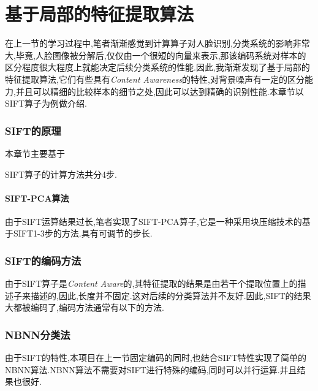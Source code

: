 \chapter{基于局部的特征提取算法}
在上一节的学习过程中,笔者渐渐感觉到计算算子对人脸识别,分类系统的影响非常大,毕竟,人脸图像被分解后,仅仅由一个很短的向量来表示,那该编码系统对样本的区分程度很大程度上就能决定后续分类系统的性能.因此,我渐渐发现了基于局部的特征提取算法,它们有些具有\textit{Content Awareness}的特性,对背景噪声有一定的区分能力,并且可以精细的比较样本的细节之处,因此可以达到精确的识别性能.本章节以SIFT算子为例做介绍.
\subsection{SIFT的原理}
本章节主要基于\cite{lowe2004distinctive, issolah2013sift, juan2009comparison, siftopencv, siftvlfeat, siftubc}\newline

SIFT算子的计算方法共分4步.

\subsubsection{SIFT-PCA算法}
由于SIFT运算结果过长,笔者实现了SIFT-PCA算子\cite{ke2004pca},它是一种采用块压缩技术的基于SIFT1-3步的方法.具有可调节的步长.

\subsection{SIFT的编码方法}
由于SIFT算子是\textit{Content Aware}的,其特征提取的结果是由若干个提取位置上的描述子来描述的,因此,长度并不固定.这对后续的分类算法并不友好.因此,SIFT的结果大都被编码了,编码方法通常有以下的方法.\cite{chatfield2011devil}

\subsection{NBNN分类法}
由于SIFT的特性,本项目在上一节固定编码的同时,也结合SIFT特性实现了简单的NBNN算法.NBNN算法不需要对SIFT进行特殊的编码,同时可以并行运算.并且结果也很好.